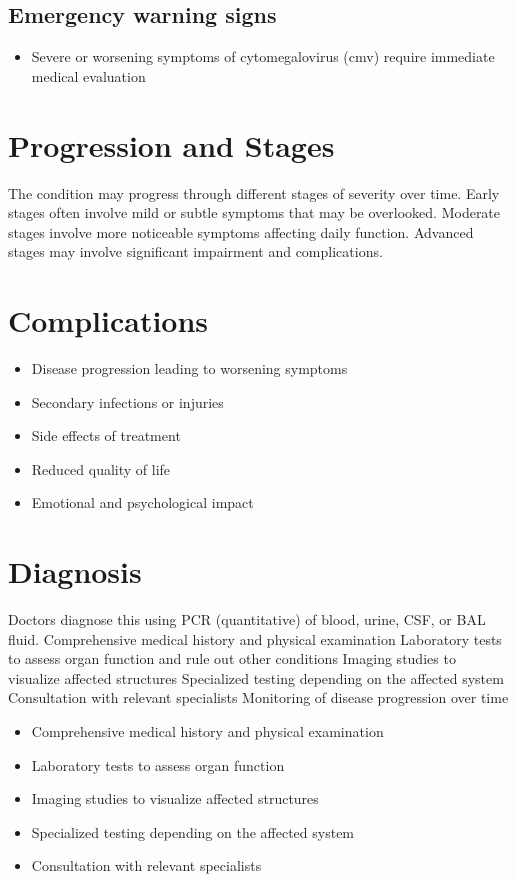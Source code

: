 \subsection{Emergency warning signs}
\begin{itemize}[noitemsep]
  \item Severe or worsening symptoms of cytomegalovirus (cmv) require immediate medical evaluation
\end{itemize}
\section{Progression and Stages}
The condition may progress through different stages of severity over time. Early stages often involve mild or subtle symptoms that may be overlooked. Moderate stages involve more noticeable symptoms affecting daily function. Advanced stages may involve significant impairment and complications.
\section{Complications}
\begin{itemize}[noitemsep]
  \item Disease progression leading to worsening symptoms
  \item Secondary infections or injuries
  \item Side effects of treatment
  \item Reduced quality of life
  \item Emotional and psychological impact
\end{itemize}
\section{Diagnosis}
Doctors diagnose this using PCR (quantitative) of blood, urine, CSF, or BAL fluid. Comprehensive medical history and physical examination Laboratory tests to assess organ function and rule out other conditions Imaging studies to visualize affected structures Specialized testing depending on the affected system Consultation with relevant specialists Monitoring of disease progression over time

\begin{itemize}[noitemsep]
  \item Comprehensive medical history and physical examination
  \item Laboratory tests to assess organ function
  \item Imaging studies to visualize affected structures
  \item Specialized testing depending on the affected system
  \item Consultation with relevant specialists
\end{itemize}

